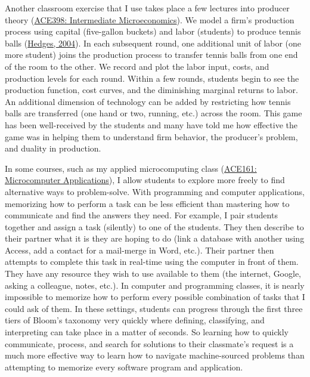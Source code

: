 \documentclass[12pt]{article}
\begin{document}
Another classroom exercise that I use takes place a few lectures into producer theory (\href{https://bryanparthum.s3.us-east-2.amazonaws.com/Syllabus_Intermediate_Micro.pdf}{ACE398: Intermediate Microeconomics}). We model a firm's production process using capital (five-gallon buckets) and labor (students) to produce tennis balls (\href{https://www.economicsnetwork.ac.uk/themes/games/tennis\%20balls}{Hedges, 2004}). In each subsequent round, one additional unit of labor (one more student) joins the production process to transfer tennis balls from one end of the room to the other. We record and plot the labor input, costs, and production levels for each round. Within a few rounds, students begin to see the production function, cost curves, and the diminishing marginal returns to labor. An additional dimension of technology can be added by restricting how tennis balls are transferred (one hand or two, running, etc.) across the room. This game has been well-received by the students and many have told me how effective the game was in helping them to understand firm behavior, the producer's problem, and duality in production.

In some courses, such as my applied microcomputing class (\href{https://bryanparthum.s3.us-east-2.amazonaws.com/Syllabus_Microcomputing.pdf}{ACE161: Microcomputer Applications}), I allow students to explore more freely to find alternative ways to problem-solve. With programming and computer applications, memorizing how to perform a task can be less efficient than mastering how to communicate and find the answers they need. For example, I pair students together and assign a task (silently) to one of the students. They then describe to their partner what it is they are hoping to do (link a database with another using Access, add a contact for a mail-merge in Word, etc.). Their partner then attempts to complete this task in real-time using the computer in front of them. They have any resource they wish to use available to them (the internet, Google, asking a colleague, notes, etc.). In computer and programming classes, it is nearly impossible to memorize how to perform every possible combination of tasks that I could ask of them. In these settings, students can progress through the first three tiers of Bloom's taxonomy very quickly where defining, classifying, and interpreting can take place in a matter of seconds. So learning how to quickly communicate, process, and search for solutions to their classmate's request is a much more effective way to learn how to navigate machine-sourced problems than attempting to memorize every software program and application.
\end{document}
